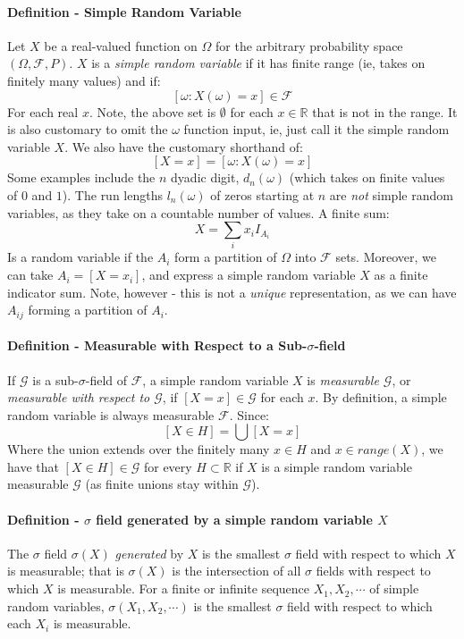 \documentclass[12pt,a4paper]{article}
\newcommand{\1}[1]{\mathbbm{1}\left\{ #1 \right\}}
\newcommand{\R}{\mathbb{R}}
\newcommand{\fcal}{\mathcal{F}}
\newcommand{\gcal}{\mathcal{G}}
\begin{document}
\paragraph{Definition - Simple Random Variable} Let $X$ be a real-valued function on $\Omega$ for the arbitrary probability space $(\Omega,\fcal,P)$. $X$ is a \textit{simple random variable} if it has finite range (ie, takes on finitely many values) and if:
$$
	\left[\omega : X(\omega) = x\right] \in \fcal
$$
For each real $x$. Note, the above set is $\emptyset$ for each $x \in \R$ that is not in the range. It is also customary to omit the $\omega$ function input, ie, just call it the simple random variable $X$. We also have the customary shorthand of:
$$
	\left[X = x\right] = \left[\omega : X(\omega) = x\right]
$$
Some examples include the $n$ dyadic digit, $d_n(\omega)$ (which takes on finite values of $0$ and $1$). The run lengths $l_n(\omega)$ of zeros starting at $n$ are \textit{not} simple random variables, as they take on a countable number of values. A finite sum:
$$
	X = \sum_i x_i I_{A_i}
$$
Is a random variable if the $A_i$ form a partition of $\Omega$ into $\fcal$ sets. Moreover, we can take $A_i = [X = x_i]$, and express a simple random variable $X$ as a finite indicator sum. Note, however - this is not a \textit{unique} representation, as we can have $A_{ij}$ forming a partition of $A_i$.

\paragraph{Definition - Measurable with Respect to a Sub-$\sigma$-field} If $\gcal$ is a sub-$\sigma$-field of $\fcal$, a simple random variable $X$ is \textit{measurable $\gcal$}, or \textit{measurable with respect to $\gcal$}, if $[X = x] \in \gcal$ for each $x$. By definition, a simple random variable is always measurable $\fcal$. Since:
$$
	[X \in H] = \bigcup [X = x]
$$
Where the union extends over the finitely many $x \in H$ and $x \in range(X)$, we have that $[X \in H] \in \gcal$ for every $H \subset \R$ if $X$ is a simple random variable measurable $\gcal$ (as finite unions stay within $\gcal$).

\paragraph{Definition - $\sigma$ field generated by a simple random variable $X$} The $\sigma$ field $\sigma(X)$ \textit{generated} by $X$ is the smallest $\sigma$ field with respect to which $X$ is measurable; that is $\sigma(X)$ is the intersection of all $\sigma$ fields with respect to which $X$ is measurable. For a finite or infinite sequence $X_1, X_2, \cdots$ of simple random variables, $\sigma(X_1, X_2, \cdots)$ is the smallest $\sigma$ field with respect to which each $X_i$ is measurable.
\end{document}
